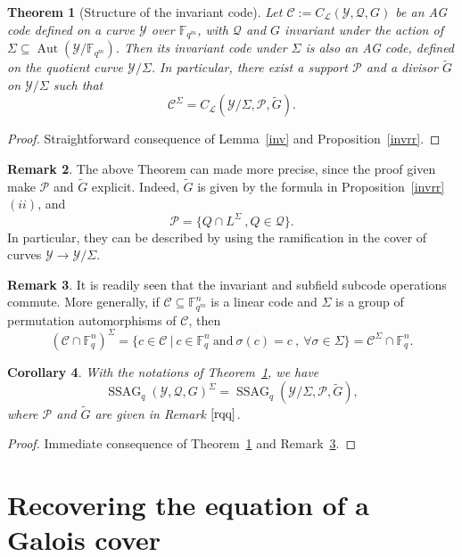 \documentclass[10pt]{article}
\newtheorem{thm}{Theorem}
\newtheorem{coro1}[thm]{Corollary}
\theoremstyle{definition}
\newtheorem{rq1}[thm]{Remark}
\theoremstyle{definition}
\theoremstyle{definition}
\newcommand{\Fqm}{\mathbb{F}_{q^m}}
\newcommand{\Fq}{\mathbb{F}_q}
\newcommand{\su}{\subseteq}
\newcommand{\Y}{\mathcal{Y}}
\newcommand{\PR}{\mathcal{P}}
\newcommand{\QR}{\mathcal{Q}}
\newcommand{\Aut}{\operatorname{Aut}}
\newcommand{\ssag}{\operatorname{SSAG}}
\newcommand{\calL}{\mathcal{L}}
\begin{document}
\begin{thm} [Structure of the invariant code] \label{invstruct}
Let $\mathcal{C} := C_{\calL}(\Y,\QR,G)$ be an AG code defined on a curve $\Y$ over $\Fqm$, with $\QR$ and $G$ invariant under the action of $\Sigma \su \Aut(\Y/\Fqm)$. Then its invariant code under $\Sigma$ is also an AG code, defined on the quotient curve $\Y/\Sigma$. In particular, there exist a support $\PR$ and a divisor $\tilde{G}$ on $\Y/\Sigma$ such that
\[\mathcal{C}^{\Sigma} = C_{\calL}(\Y/\Sigma,\PR,\tilde{G}).\]
\end{thm}

\begin{proof}
Straightforward consequence of Lemma~\ref{inv} and Proposition~\ref{invrr}.
\end{proof}

\begin{rq1} \label{rqq}
The above Theorem can made more precise, since the proof given make $\PR$ and $\tilde{G}$ explicit. Indeed, $\tilde{G}$ is given by the formula in Proposition~\ref{invrr} $(ii)$, and \[\PR = \{Q \cap L^{\Sigma} \ , Q \in \QR\}. \] In particular, they can be described by using the ramification in the cover of curves $\Y \longrightarrow \Y/\Sigma$.
\end{rq1}

\begin{rq1} \label{commute}
It is readily seen that the invariant and subfield subcode operations commute.
More generally, if $\mathcal{C}\su\Fqm^n$ is a linear code and $\Sigma$ is a group of permutation automorphisms of $\mathcal{C}$, then
\[(\mathcal{C}\cap \Fq^n)^{\Sigma} = \{c \in \mathcal{C} \ | \ c \in \Fq^n \ \textrm{and} \ \sigma(c)=c \ , \ \forall \sigma \in \Sigma\} = \mathcal{C}^{\Sigma} \cap \Fq^n.\]
\end{rq1}

\begin{coro1} \label{ssag}
With the notations of Theorem~\ref{invstruct}, we have
\[\ssag_q(\Y,\QR,G)^{\Sigma} = \ssag_q(\Y/\Sigma,\PR,\tilde{G}),\]
where $\PR$ and $\tilde{G}$ are given in Remark $\ref{rqq}$.
\end{coro1}

\begin{proof}
Immediate consequence of Theorem~\ref{invstruct} and Remark~\ref{commute}.
\end{proof}


\section{Recovering the equation of a Galois cover} \label{sectionfour}
\end{document}
